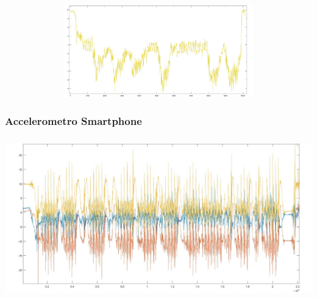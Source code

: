 \documentclass[a4paper]{article}
\begin{document}
\begin{minipage}{\linewidth}
\begin{center}
\includegraphics[width=154mm, height= 40mm]{./images/registrazione_tesi/accZ.jpg} 
\end{center}
\end{minipage}
\makebox[\linewidth]{}
\makebox[\linewidth]{}\makebox[\linewidth]{}\makebox[\linewidth]{}
\makebox[\linewidth]{}\makebox[\linewidth]{}\makebox[\linewidth]{}

\subsubsection{Accelerometro Smartphone}
\begin{minipage}{\linewidth}
\begin{center}
\includegraphics[width=160mm, height= 70mm]{./images/registrazione_tesi/acc_ph.jpg} 
\end{center}
\end{minipage}
\makebox[\linewidth]{}
\makebox[\linewidth]{}\makebox[\linewidth]{}\makebox[\linewidth]{}
\makebox[\linewidth]{}\makebox[\linewidth]{}\makebox[\linewidth]{}
\makebox[\linewidth]{}\makebox[\linewidth]{}\makebox[\linewidth]{}
\end{document}
